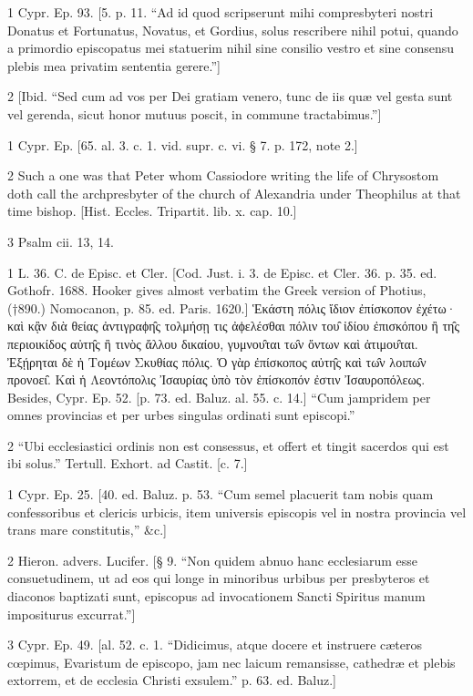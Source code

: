 1
Cypr. Ep. 93. [5. p. 11. “Ad id quod scripserunt mihi compresbyteri nostri Donatus et Fortunatus, Novatus, et Gordius, solus rescribere nihil potui, quando a primordio episcopatus mei statuerim nihil sine consilio vestro et sine consensu plebis mea privatim sententia gerere.”]

2
[Ibid. “Sed cum ad vos per Dei gratiam venero, tunc de iis quæ vel gesta sunt vel gerenda, sicut honor mutuus poscit, in commune tractabimus.”]

1
Cypr. Ep. [65. al. 3. c. 1. vid. supr. c. vi. § 7. p. 172, note 2.]

2
Such a one was that Peter whom Cassiodore writing the life of Chrysostom doth call the archpresbyter of the church of Alexandria under Theophilus at that time bishop. [Hist. Eccles. Tripartit. lib. x. cap. 10.]

3
Psalm cii. 13, 14.

1
L. 36. C. de Episc. et Cler. [Cod. Just. i. 3. de Episc. et Cler. 36. p. 35. ed. Gothofr. 1688. Hooker gives almost verbatim the Greek version of Photius, (†890.) Nomocanon, p. 85. ed. Paris. 1620.] Ἑκάστη πόλις ἴδιον ἐπίσκοπον ἐχέτω· καὶ κᾂν διὰ θείας ἀντιγραϕη̑ς τολμήσῃ τις ἀϕελέσθαι πόλιν του̑ ἰδίου ἐπισκόπου ἢ τη̑ς περιοικίδος αὐτη̑ς ἢ τινὸς ἄλλου δικαίου, γυμνου̑ται τω̑ν ὄντων καὶ ἀτιμου̑ται. Ἐξῄρηται δὲ ἡ Τομέων Σκυθίας πόλις. Ὁ γὰρ ἐπίσκοπος αὐτη̑ς καὶ τω̑ν λοιπω̑ν προνοει̑. Καὶ ἡ Λεοντόπολις Ἰσαυρίας ὑπὸ τὸν ἐπίσκοπόν ἐστιν Ἰσαυροπόλεως. Besides, Cypr. Ep. 52. [p. 73. ed. Baluz. al. 55. c. 14.] “Cum jampridem per omnes provincias et per urbes singulas ordinati sunt episcopi.”

2
“Ubi ecclesiastici ordinis non est consessus, et offert et tingit sacerdos qui est ibi solus.” Tertull. Exhort. ad Castit. [c. 7.]

1
Cypr. Ep. 25. [40. ed. Baluz. p. 53. “Cum semel placuerit tam nobis quam confessoribus et clericis urbicis, item universis episcopis vel in nostra provincia vel trans mare constitutis,” &c.]

2
Hieron. advers. Lucifer. [§ 9. “Non quidem abnuo hanc ecclesiarum esse consuetudinem, ut ad eos qui longe in minoribus urbibus per presbyteros et diaconos baptizati sunt, episcopus ad invocationem Sancti Spiritus manum impositurus excurrat.”]

3
Cypr. Ep. 49. [al. 52. c. 1. “Didicimus, atque docere et instruere cæteros cœpimus, Evaristum de episcopo, jam nec laicum remansisse, cathedræ et plebis extorrem, et de ecclesia Christi exsulem.” p. 63. ed. Baluz.]

